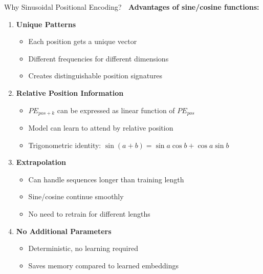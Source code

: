 \documentclass[aspectratio=169]{beamer}
\begin{document}
\begin{frame}[shrink=10]{Why Sinusoidal Positional Encoding? 🌊}
\textbf{Advantages of sine/cosine functions:}

\vspace{1em}

\begin{enumerate}\setlength{\itemsep}{0pt}
    \item \textbf{Unique Patterns}
    \begin{itemize}\setlength{\itemsep}{0pt}
        \item Each position gets a unique vector
        \item Different frequencies for different dimensions
        \item Creates distinguishable position signatures
    \end{itemize}

    \vspace{0.5em}

    \item \textbf{Relative Position Information}
    \begin{itemize}\setlength{\itemsep}{0pt}
        \item $PE_{pos+k}$ can be expressed as linear function of $PE_{pos}$
        \item Model can learn to attend by relative position
        \item Trigonometric identity: $\sin(a+b) = \sin a \cos b + \cos a \sin b$
    \end{itemize}

    \vspace{0.5em}

    \item \textbf{Extrapolation}
    \begin{itemize}\setlength{\itemsep}{0pt}
        \item Can handle sequences longer than training length
        \item Sine/cosine continue smoothly
        \item No need to retrain for different lengths
    \end{itemize}

    \vspace{0.5em}

    \item \textbf{No Additional Parameters}
    \begin{itemize}\setlength{\itemsep}{0pt}
        \item Deterministic, no learning required
        \item Saves memory compared to learned embeddings
    \end{itemize}
\end{enumerate}
\end{frame}
\end{document}

